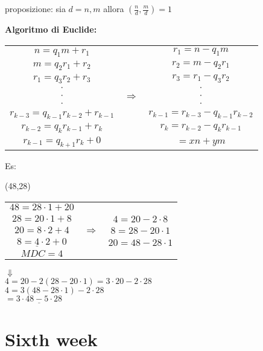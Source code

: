 \documentclass[11pt, letterpaper]{article}
\begin{document}
proposizione: sia $d=n,m$ allora $(\frac{n}{d},\frac{m}{d})=1$

\textbf{Algoritmo di Euclide:}
\begin{center}
    \begin{tabular}{ c c c }
        
        $n=q_{1}m+r_{1}$ & & $r_{1}=n-q_{1}m$\\
        $m=q_{2}r_{1}+r_{2}$ & & $r_{2}=m-q_{2}r_{1}$\\
        $r_{1}=q_{3}r_{2}+r_{3}$ & &$r_{3}=r_{1}-q_{3}r_{2}$\\
        $\cdot$ & &$\cdot$\\
        $\cdot$ & $\Rightarrow$ & $\cdot$\\
        $\cdot$ & & $\cdot$\\
        $r_{k-3}=q_{k-1}r_{k-2}+r_{k-1}$ & &$r_{k-1}=r_{k-3}-q_{k-1}r_{k-2}$\\
        $r_{k-2}=q_{k}r_{k-1}+r_{k}$ & & $r_{k}=r_{k-2}-q_{k}r_{k-1}$\\
        $r_{k-1}=q_{k+1}r_{k}+0$ & & $= xn+ym$
        
    \end{tabular}
\end{center}

Es:
\begin{center}
    (48,28)

    \begin{tabular}{ c c c }
        $48=28\cdot 1 + 20$ & &\\
        $28=20\cdot 1 + 8$ && $4=20-2\cdot 8$\\
        $20=8\cdot 2 + 4$ &$\Rightarrow$& $8=28-20\cdot 1$\\
        $8=\underline{4}\cdot 2 + 0$ &&$20 = 48-28\cdot 1$\\
        $MDC = 4$&&\\
    \end{tabular}

    $\Downarrow$\\
    $4=20-2(28-20\cdot 1)=3\cdot 20 - 2\cdot 28$\\
    $4=3(48-28\cdot 1)-2\cdot 28$\\
    $=\underline{3\cdot 48 - 5\cdot 28}$

\end{center}

\newpage
\section{Sixth week}
\end{document}
